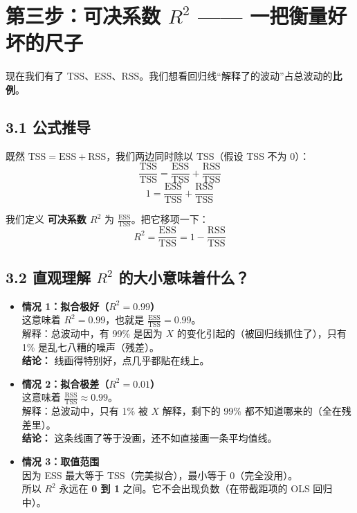 \documentclass[12pt,a4paper]{article}
\begin{document}
\section*{第三步：可决系数 \(R^2\) —— 一把衡量好坏的尺子}

现在我们有了 TSS、ESS、RSS。我们想看回归线“解释了的波动”占总波动的\textbf{比例}。

\subsection*{3.1 公式推导}

既然 \( \mathrm{TSS} = \mathrm{ESS} + \mathrm{RSS} \)，我们两边同时除以 \(\mathrm{TSS}\)（假设 TSS 不为 0）：
\[
\frac{\mathrm{TSS}}{\mathrm{TSS}} = \frac{\mathrm{ESS}}{\mathrm{TSS}} + \frac{\mathrm{RSS}}{\mathrm{TSS}}
\]
\[
1 = \frac{\mathrm{ESS}}{\mathrm{TSS}} + \frac{\mathrm{RSS}}{\mathrm{TSS}}
\]

我们定义 \textbf{可决系数 \(R^2\)} 为 \(\frac{\mathrm{ESS}}{\mathrm{TSS}}\)。把它移项一下：
\begin{equation}
    R^2 = \frac{\mathrm{ESS}}{\mathrm{TSS}} = 1 - \frac{\mathrm{RSS}}{\mathrm{TSS}}
\end{equation}

\subsection*{3.2 直观理解 \(R^2\) 的大小意味着什么？}

\begin{itemize}[itemsep=6pt,topsep=0pt]
    \item \textbf{情况 1：拟合极好（\(R^2 = 0.99\)）}\\
    这意味着 \(R^2 = 0.99\)，也就是 \(\frac{\mathrm{ESS}}{\mathrm{TSS}} = 0.99\)。\\
    解释：总波动中，有 99\% 是因为 \(X\) 的变化引起的（被回归线抓住了），只有 1\% 是乱七八糟的噪声（残差）。\\
    \textbf{结论：} 线画得特别好，点几乎都贴在线上。

    \item \textbf{情况 2：拟合极差（\(R^2 = 0.01\)）}\\
    这意味着 \(\frac{\mathrm{RSS}}{\mathrm{TSS}} \approx 0.99\)。\\
    解释：总波动中，只有 1\% 被 \(X\) 解释，剩下的 99\% 都不知道哪来的（全在残差里）。\\
    \textbf{结论：} 这条线画了等于没画，还不如直接画一条平均值线。

    \item \textbf{情况 3：取值范围}\\
    因为 ESS 最大等于 TSS（完美拟合），最小等于 0（完全没用）。\\
    所以 \(R^2\) 永远在 \textbf{0 到 1} 之间。它不会出现负数（在带截距项的 OLS 回归中）。
\end{itemize}
\end{document}
